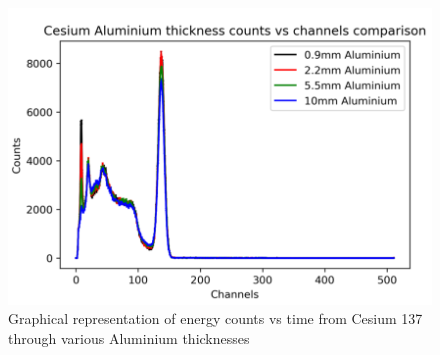 \begin{figure}[H]
\centering
\includegraphics[scale=0.9]{Media/DataAnalysis/Screenshot 2021-03-15 at 05.49.54.png}
\caption{Graphical representation of energy counts vs time from Cesium 137 through various Aluminium thicknesses \cite{GammaRay}}
\label{Data 2}
\end{figure}